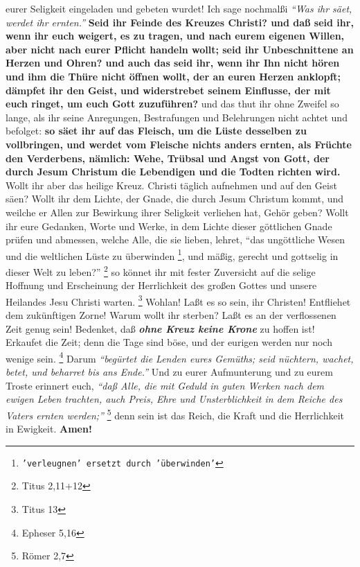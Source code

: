 eurer Seligkeit eingeladen und gebeten wurdet! Ich sage nochmalßi
\textit{"`Was ihr säet, werdet ihr ernten."'}
\label{ref:18_11_feinde_des_kreuzes}
\textbf{Seid ihr Feinde des Kreuzes Christi? und daß seid
ihr, wenn ihr euch weigert, es zu tragen, und nach eurem eigenen Willen, aber
nicht nach eurer Pflicht handeln wollt; seid ihr
Unbeschnittene an Herzen und
Ohren? und auch das seid ihr, wenn ihr Ihn nicht hören und ihm die Thüre nicht
öffnen wollt, der an euren Herzen anklopft; dämpfet ihr den Geist, und
widerstrebet seinem Einflusse, der mit euch ringet, um euch Gott zuzuführen?}
und das thut ihr ohne Zweifel so lange, als ihr seine Anregungen, Bestrafungen
und Belehrungen nicht achtet und befolget: \textbf{so säet ihr auf das Fleisch,
um die
Lüste desselben zu vollbringen, und werdet vom Fleische nichts anders ernten,
als Früchte den Verderbens, nämlich: Wehe, Trübsal und Angst von Gott, der durch
Jesum Christum die Lebendigen und die Todten richten wird.} Wollt ihr aber
das heilige Kreuz. Christi täglich aufnehmen und auf den Geist säen? Wollt ihr
dem Lichte, der Gnade, die durch Jesum Christum kommt, und weilche er Allen
zur Bewirkung ihrer Seligkeit verliehen hat, Gehör geben? Wollt ihr eure
Gedanken, Worte und Werke, in dem Lichte dieser göttlichen
Gnade prüfen und
abmessen, welche Alle, die sie lieben, lehret,
"`das ungöttliche Wesen und die
weltlichen Lüste zu überwinden
\footnote{\texttt{'verleugnen' ersetzt durch 'überwinden'}}, und mäßig, gerecht
und gottselig in dieser Welt
zu leben?"'
\footnote{Titus 2,11+12}
so könnet ihr mit fester Zuversicht auf
die selige Hoffnung und Erscheinung der Herrlichkeit des großen Gottes und
unsere Heilandes Jesu Christi warten.
\footnote{Titus 13}
Wohlan! Laßt es so
sein, ihr Christen! Entfliehet dem zukünftigen Zorne! Warum wollt ihr sterben?
Laßt es an der verflossenen Zeit genug sein! Bedenket, daß \textbf{\textit{ohne
Kreuz keine
Krone}} zu hoffen ist! Erkaufet die Zeit; denn die
Tage sind böse, und der
eurigen werden nur noch wenige sein.
\footnote{Epheser 5,16}
Darum
\textit{"`begürtet die
Lenden eures Gemüths; seid nüchtern, wachet, betet, und beharret bis ans
Ende."'}
Und zu eurer Aufmunterung und zu eurem Troste erinnert euch,
\textit{"`daß Alle, die mit
Geduld in guten Werken nach dem ewigen Leben trachten, auch Preis, Ehre und
Unsterblichkeit in dem Reiche des Vaters ernten werden;"'}
\footnote{Römer 2,7}
denn sein ist das Reich, die Kraft und die Herrlichkeit in Ewigkeit.
\textbf{Amen!}
